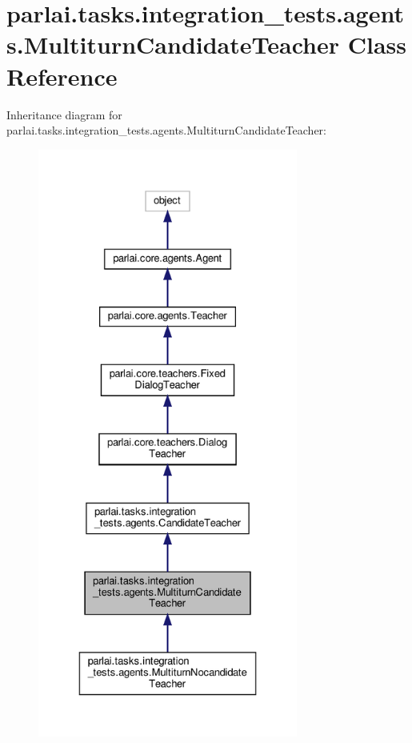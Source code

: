 \hypertarget{classparlai_1_1tasks_1_1integration__tests_1_1agents_1_1MultiturnCandidateTeacher}{}\section{parlai.\+tasks.\+integration\+\_\+tests.\+agents.\+Multiturn\+Candidate\+Teacher Class Reference}
\label{classparlai_1_1tasks_1_1integration__tests_1_1agents_1_1MultiturnCandidateTeacher}


Inheritance diagram for parlai.\+tasks.\+integration\+\_\+tests.\+agents.\+Multiturn\+Candidate\+Teacher\+:
\nopagebreak
\begin{figure}[H]
\begin{center}
\leavevmode
\includegraphics[height=550pt]{classparlai_1_1tasks_1_1integration__tests_1_1agents_1_1MultiturnCandidateTeacher__inherit__graph}
\end{center}
\end{figure}


